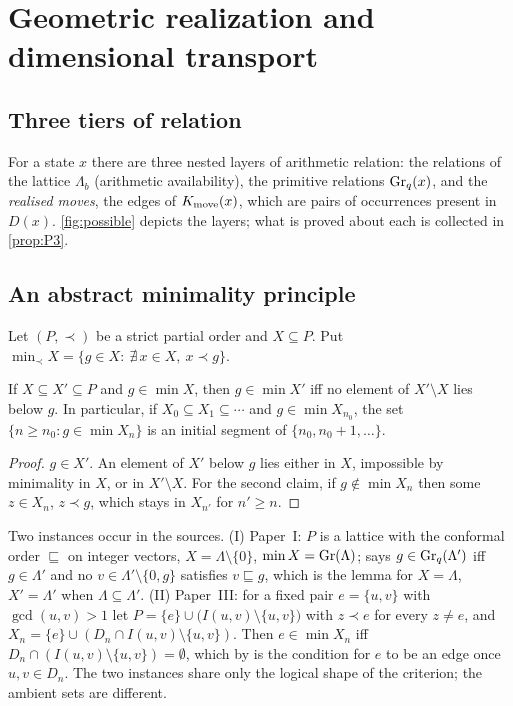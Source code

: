 \section{Geometric realization and dimensional transport}\label{sec:realization}
\subsection{Three tiers of relation}
For a state $x$ there are three nested layers of arithmetic relation: the relations of the lattice $\Lambda_b$ (arithmetic availability), the primitive relations $\mathrm{Gr}_q(x)$, and the \emph{realised moves}, the edges of $K_{\mathrm{move}}(x)$, which are pairs of occurrences present in $D(x)$. \cref{fig:possible} depicts the layers; what is proved about each is collected in \cref{prop:P3}.

\subsection{An abstract minimality principle}
\begin{definition}
Let $(P,\prec)$ be a strict partial order and $X\subseteq P$. Put $\min_\prec X=\{g\in X:\ \nexists\,x\in X,\ x\prec g\}$.
\end{definition}
\begin{lemma}\label{lem:minimal}
If $X\subseteq X'\subseteq P$ and $g\in\min X$, then $g\in\min X'$ iff no element of $X'\setminus X$ lies below $g$. In particular, if $X_0\subseteq X_1\subseteq\cdots$ and $g\in\min X_{n_0}$, the set $\{n\ge n_0:g\in\min X_n\}$ is an initial segment of $\{n_0,n_0+1,\dots\}$.
\end{lemma}
\begin{proof}
$g\in X'$. An element of $X'$ below $g$ lies either in $X$, impossible by minimality in $X$, or in $X'\setminus X$. For the second claim, if $g\notin\min X_n$ then some $z\in X_n$, $z\prec g$, which stays in $X_{n'}$ for $n'\ge n$.
\end{proof}
\noindent Two instances occur in the sources. (I) Paper~I: $P$ is a lattice with the conformal order $\sqsubseteq$ on integer vectors, $X=\Lambda\setminus\{0\}$, $\min X=\mathrm{Gr}(\Lambda)$;  says $g\in\mathrm{Gr}_q(\Lambda')$ iff $g\in\Lambda'$ and no $v\in\Lambda'\setminus\{0,g\}$ satisfies $v\sqsubseteq g$, which is the lemma for $X=\Lambda$, $X'=\Lambda'$ when $\Lambda\subseteq\Lambda'$. (II) Paper~III: for a fixed pair $e=\{u,v\}$ with $\gcd(u,v)>1$ let $P=\{e\}\cup\bigl(I(u,v)\setminus\{u,v\}\bigr)$ with $z\prec e$ for every $z\ne e$, and $X_n=\{e\}\cup(D_n\cap I(u,v)\setminus\{u,v\})$. Then $e\in\min X_n$ iff $D_n\cap(I(u,v)\setminus\{u,v\})=\emptyset$, which by  is the condition for $e$ to be an edge once $u,v\in D_n$. The two instances share only the logical shape of the criterion; the ambient sets are different.

